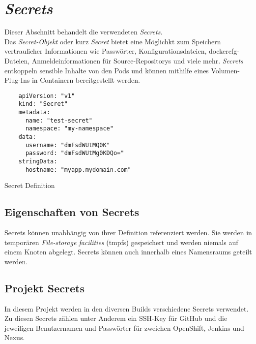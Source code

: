 \section{\emph{Secrets}}
\label{sec:buildserver-secrets}
Dieser Abschnitt behandelt die verwendeten \emph{Secrets}.\\

Das \emph{Secret-Objekt} oder kurz \emph{Secret} bietet eine Möglichkt zum Speichern vertraulicher Informationen wie Passwörter, Konfigurationsdateien, dockercfg-Dateien, Anmeldeinformationen für Source-Repositorys und viele mehr. \emph{Secrets} entkoppeln sensible Inhalte von den Pods und können mithilfe eines Volumen-Plug-Ins in Containern bereitgestellt werden.

\begin{listing}[H]
	\centering
	\begin{verbatim}
	apiVersion: "v1"
	kind: "Secret"
	metadata:
	  name: "test-secret"
	  namespace: "my-namespace"
	data: 
	  username: "dmFsdWUtMQ0K"
	  password: "dmFsdWUtMg0KDQo="
	stringData: 
	  hostname: "myapp.mydomain.com"
	\end{verbatim}
	\caption{Secret Definition}
\end{listing}

\subsection{Eigenschaften von Secrets}

Secrets können unabhängig von ihrer Definition referenziert werden. Sie werden in temporären \emph{File-storage facilities} (tmpfs) gespeichert und werden niemals auf einem Knoten abgelegt. Secrets können auch innerhalb eines Namensraums geteilt werden.

\subsection{Projekt Secrets}

In diesem Projekt werden in den diversen Builds verschiedene Secrets verwendet. Zu diesen Secrets zählen unter Anderem ein SSH-Key für GitHub und die jeweiligen Benutzernamen und Passwörter für zweichen OpenShift, Jenkins und Nexus.